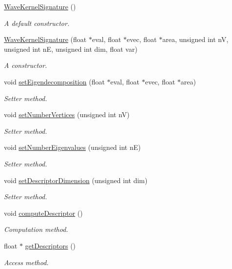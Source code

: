 \begin{DoxyCompactItemize}
\item 
\hyperlink{classHeatDiffusion_1_1Descriptor_1_1WaveKernelSignature_a16819e1056754d40b48fdae2b1ac22ff}{Wave\-Kernel\-Signature} ()
\begin{DoxyCompactList}\small\item\em A default constructor. \end{DoxyCompactList}\item 
\hyperlink{classHeatDiffusion_1_1Descriptor_1_1WaveKernelSignature_a857e0c9129837809216f169c758ce02c}{Wave\-Kernel\-Signature} (float $\ast$eval, float $\ast$evec, float $\ast$area, unsigned int n\-V, unsigned int n\-E, unsigned int dim, float var)
\begin{DoxyCompactList}\small\item\em A constructor. \end{DoxyCompactList}\item 
void \hyperlink{classHeatDiffusion_1_1Descriptor_1_1WaveKernelSignature_a5f0760b6238c1571ef3f0135efbef6f3}{set\-Eigendecomposition} (float $\ast$eval, float $\ast$evec, float $\ast$area)
\begin{DoxyCompactList}\small\item\em Setter method. \end{DoxyCompactList}\item 
void \hyperlink{classHeatDiffusion_1_1Descriptor_1_1WaveKernelSignature_abf51ce3973d59ff73276ad86ecd3cc43}{set\-Number\-Vertices} (unsigned int n\-V)
\begin{DoxyCompactList}\small\item\em Setter method. \end{DoxyCompactList}\item 
void \hyperlink{classHeatDiffusion_1_1Descriptor_1_1WaveKernelSignature_a69e8ba8323841346583303d5d08d3e6b}{set\-Number\-Eigenvalues} (unsigned int n\-E)
\begin{DoxyCompactList}\small\item\em Setter method. \end{DoxyCompactList}\item 
void \hyperlink{classHeatDiffusion_1_1Descriptor_1_1WaveKernelSignature_a2b1204eb9d56a65532ab502f8b844c67}{set\-Descriptor\-Dimension} (unsigned int dim)
\begin{DoxyCompactList}\small\item\em Setter method. \end{DoxyCompactList}\item 
void \hyperlink{classHeatDiffusion_1_1Descriptor_1_1WaveKernelSignature_aed65171dd85cc4375b9d87248bce03b6}{compute\-Descriptor} ()
\begin{DoxyCompactList}\small\item\em Computation method. \end{DoxyCompactList}\item 
float $\ast$ \hyperlink{classHeatDiffusion_1_1Descriptor_1_1WaveKernelSignature_af5662d581c6b98ac60c35e690ceb18ec}{get\-Descriptors} ()
\begin{DoxyCompactList}\small\item\em Access method. \end{DoxyCompactList}\end{DoxyCompactItemize}
